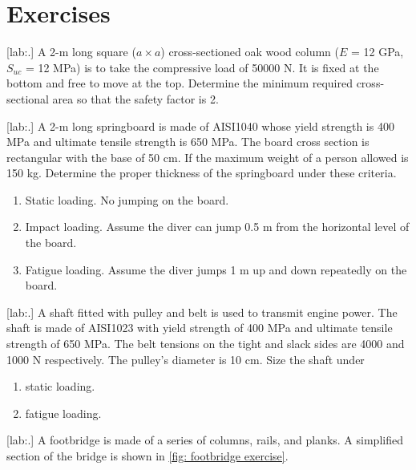 \documentclass[a4paper,openany,12pt]{book}
\begin{document}
{{\section{Exercises}
\label{exercises-4}
[lab:.] A 2-m long square
(\(a \times a\)) cross-sectioned oak wood column (\(E\) = 12 GPa, \(S_{uc}\) =
12 MPa) is to take the compressive load of 50000 N. It is fixed at the
bottom and free to move at the top. Determine the minimum required
cross-sectional area so that the safety factor is 2.


[lab:.] A 2-m long springboard is
made of AISI1040 whose yield strength is 400 MPa and ultimate tensile
strength is 650 MPa. The board cross section is rectangular with the
base of 50 cm. If the maximum weight of a person allowed is 150 kg.
Determine the proper thickness of the springboard under these criteria.



\begin{enumerate}
\item Static loading. No jumping on the board.

\item Impact loading. Assume the diver can jump 0.5 m from the horizontal
level of the board.

\item Fatigue loading. Assume the diver jumps 1 m up and down repeatedly on
the board.
\end{enumerate}

[lab:.] A shaft fitted with pulley
and belt is used to transmit engine power. The shaft is made of AISI1023
with yield strength of 400 MPa and ultimate tensile strength of 650 MPa.
The belt tensions on the tight and slack sides are 4000 and 1000 N
respectively. The pulley's diameter is 10 cm. Size the shaft under



\begin{enumerate}
\item static loading.

\item fatigue loading.
\end{enumerate}

[lab:.] A
footbridge is made of a series of columns, rails, and planks. A
simplified section of the bridge is shown in
\ref{fig: footbridge exercise}.


}}
\end{document}
